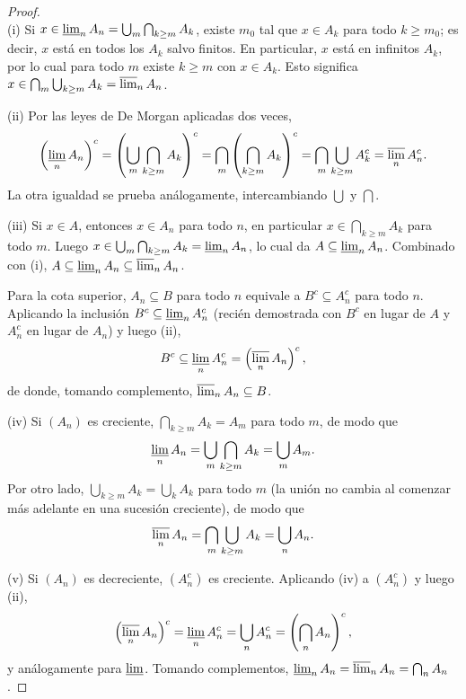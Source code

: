 \documentclass[11pt, a4paper]{article}
\begin{document}
\begin{proof}\leavevmode\\
(i) Si $x \in \varliminf_n A_n = \bigcup_m \bigcap_{k \ge m} A_k$, existe $m_0$ tal que $x \in
A_k$ para todo $k \ge m_0$; es decir, $x$ está en todos los $A_k$ salvo finitos. En particular,
$x$ está en infinitos $A_k$, por lo cual para todo $m$ existe $k \ge m$ con $x \in A_k$. Esto
significa $x \in \bigcap_m \bigcup_{k \ge m} A_k = \varlimsup_n A_n$.

(ii) Por las leyes de De Morgan aplicadas dos veces,
$$ \left(\varliminf_n A_n\right)^c = \left(\bigcup_m \bigcap_{k \ge m} A_k\right)^c =
\bigcap_m \left(\bigcap_{k \ge m} A_k\right)^c = \bigcap_m \bigcup_{k \ge m} A_k^c =
\varlimsup_n A_n^c. $$
La otra igualdad se prueba análogamente, intercambiando $\bigcup$ y $\bigcap$.

(iii) Si $x \in A$, entonces $x \in A_n$ para todo $n$, en particular $x \in \bigcap_{k \ge m}
A_k$ para todo $m$. Luego $x \in \bigcup_m \bigcap_{k \ge m} A_k = \varliminf_n A_n$, lo cual
da $A \subseteq \varliminf_n A_n$. Combinado con (i), $A \subseteq \varliminf_n A_n \subseteq
\varlimsup_n A_n$.

Para la cota superior, $A_n \subseteq B$ para todo $n$ equivale a $B^c \subseteq A_n^c$ para todo
$n$. Aplicando la inclusión $B^c \subseteq \varliminf_n A_n^c$ (recién demostrada con $B^c$ en
lugar de $A$ y $A_n^c$ en lugar de $A_n$) y luego (ii),
$$ B^c \subseteq \varliminf_n A_n^c = \left(\varlimsup_n A_n\right)^c, $$
de donde, tomando complemento, $\varlimsup_n A_n \subseteq B$.

(iv) Si $(A_n)$ es creciente, $\bigcap_{k \ge m} A_k = A_m$ para todo $m$, de modo que
$$ \varliminf_n A_n = \bigcup_m \bigcap_{k \ge m} A_k = \bigcup_m A_m. $$
Por otro lado, $\bigcup_{k \ge m} A_k = \bigcup_k A_k$ para todo $m$ (la unión no cambia al
comenzar más adelante en una sucesión creciente), de modo que
$$ \varlimsup_n A_n = \bigcap_m \bigcup_{k \ge m} A_k = \bigcup_n A_n. $$

(v) Si $(A_n)$ es decreciente, $(A_n^c)$ es creciente. Aplicando (iv) a $(A_n^c)$ y luego (ii),
$$ \left(\varlimsup_n A_n\right)^c = \varliminf_n A_n^c = \bigcup_n A_n^c =
\left(\bigcap_n A_n\right)^c, $$
y análogamente para $\varliminf$. Tomando complementos, $\varliminf_n A_n = \varlimsup_n A_n
= \bigcap_n A_n$.
\end{proof}
\end{document}

